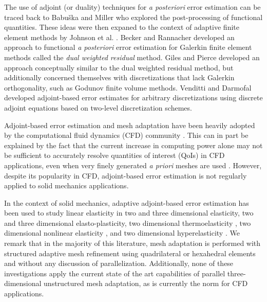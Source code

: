 The use of adjoint (or duality) techniques for \emph{a posteriori} error
estimation can be traced back to Babu\v{s}ka and Miller
\cite{babuska1984post1, babuska1984post2, babuska1984post3} who explored the
post-processing of functional quantities. These ideas were then expaned to the
context of adaptive finite element methods by Johnson et al.
\cite{eriksson1996computational}. Becker and Rannacher \cite{becker2001optimal}
developed an approach to functional \emph{a posteriori} error estimation for
Galerkin finite element methods called the \emph{dual weighted residual}
method. Giles and Pierce \cite{giles2003adjoint} developed an approach
conceptually similar to the dual weighted residual method, but additionally
concerned themselves with discretizations that lack Galerkin orthogonality,
such as Godunov finite volume methods. Venditti and Darmofal
\cite{venditti2000adjoint, venditti2002adjoint, venditti2003adjoint} developed
adjoint-based error estimates for arbitrary discretizations using discrete
adjoint equations based on two-level discretization schemes.

Adjoint-based error estimation and mesh adaptation have been heavily adopted
by the computational fluid dynamics (CFD) community \cite{fidkowski2011review}.
This can in part be explained by the fact that the current increase in
computing power alone may not be sufficient to accurately resolve
quantities of interest (QoIs) in CFD applications, even when very finely
generated \emph{a priori} meshes are used \cite{fidkowski2011review}. However,
despite its popularity in CFD, adjoint-based error estimation is not regularly
applied to solid mechanics applications.

In the context of solid mechanics, adaptive adjoint-based error estimation
has been used to study linear elasticity in two
\cite{rannacher1997feed, stein2007error, gonzalez2014mesh} and three
\cite{ghorashi2014goal} dimensional elasticity, two
\cite{rannacher1998posteriori, rannacher1999posteriori} and three
\cite{ghorashi2017goal} dimensional elasto-plasticity, two dimensional
thermoelasticity \cite{rabizadeh2015adaptive}, two dimensional
nonlinear elasticity \cite{larsson2002strategies}, and two dimensional
hyperelasticity \cite{whiteley2014error}. We remark that in the majority of
this literature, mesh adaptation is performed with structured adaptive mesh
refinement using quadrilateral or hexahedral elements and without any
discussion of parallelization. Additionally, none of these investigations
apply the current state of the art capabilities of parallel three-dimensional
unstructured mesh adaptation, as is currently the norm for CFD
applications.

